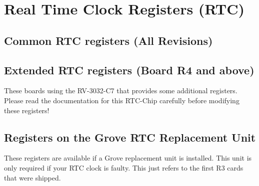 \chapter{Real Time Clock Registers (RTC)}

\section{Common RTC registers (All Revisions)}


\section{Extended RTC registers (Board R4 and above)}
These boards using the RV-3032-C7 that provides some additional registers.
Please read the documentation for this RTC-Chip carefully before modifying these registers!



\section{Registers on the Grove RTC Replacement Unit}
These registers are available if a Grove replacement unit
is installed. This unit is only required if your RTC clock is faulty.
This just refers to the first R3 cards that were shipped.





